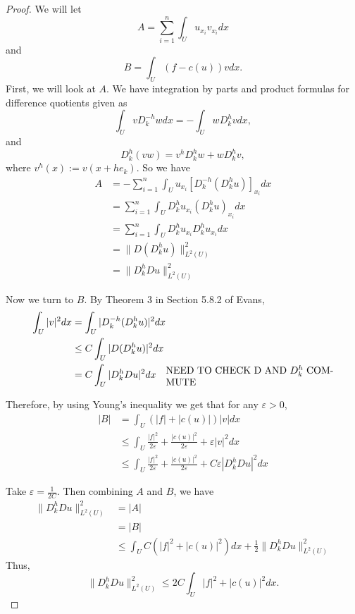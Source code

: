 \documentclass[a4paper]{article}
\begin{document}
\begin{enumerate}
\begin{proof}
      We will let
      \[ A = \sum_{i=1}^n \int_{U}^{} u_{x_i} v_{x_i} dx \]
      and
      \[ B = \int_{U}^{} (f - c(u)) v dx .\]
      First, we will look at $A$.
      We have integration by parts and product formulas for difference quotients given as
      \[ \int_{U}^{} v D_k^{-h} w dx = - \int_{U}^{} w D_k^h v dx ,\]
      and
      \[ D_k^h (vw) = v^h D_k^h w + w D_k^h v ,\]
      where $v^h(x) := v(x + he_k)$.
      So we have
      \begin{align*}
        A &= - \sum_{i=1}^n \int_{U}^{} u_{x_i} \left[ D_k^{-h} (D_k^h u) \right]_{x_i} dx \\
        &= \sum_{i=1}^n \int_{U}^{} D_k^h u_{x_i} \left( D_k^h u \right)_{x_i} dx \quad \\
        &= \sum_{i=1}^n \int_{U}^{} D_k^h u_{x_i} D_k^h u_{x_i} dx \\
        & = \| D (D_k^h u) \|_{L^2(U)}^2 \\
        &= \| D_k^h Du \|_{L^2(U)}^2
      \end{align*}

      Now we turn to $B$.
      By Theorem 3 in Section 5.8.2 of Evans,
      \begin{align*}
        \int_{U}^{} |v|^2 dx &= \int_{U}^{} |D_k^{-h} (D_k^h u)|^2 dx \\
        & \leq C \int_{U}^{} |D (D_k^h u)|^2 dx \\
        &= C \int_{U}^{} |D_k^h Du|^2 dx \quad \parbox{6cm}{NEED TO CHECK D AND $D_k^h$ COMMUTE}
      \end{align*}

      Therefore, by using Young's inequality we get that for any $\varepsilon > 0$,
      \begin{align*}
        |B| &= \int_{U}^{} (|f| + |c(u)|) |v| dx \\
        &\leq \int_{U}^{} \frac{|f|^2}{2 \varepsilon} + \frac{|c(u)|^2}{2 \varepsilon} + \varepsilon |v|^2 dx \\
        &\leq \int_{U}^{} \frac{|f|^2}{2 \varepsilon} + \frac{|c(u)|^2}{2 \varepsilon} + C\varepsilon |D_k^h Du|^2 dx
      \end{align*}

      Take $\varepsilon = \frac{1}{2C}$. Then combining $A$ and $B$, we have
      \begin{align*}
        \| D_k^h Du \|_{L^2(U)}^2 &= |A| \\
        &= |B| \\
        &\leq \int_{U}^{} C (|f|^2 + |c(u)|^2)dx + \frac{1}{2} \| D_k^h Du \|_{L^2(U)}^2
      \end{align*}
      Thus,
      \[ \| D_k^h Du \|_{L^2(U)}^2 \leq 2C \int_{U}^{} |f|^2 + |c(u)|^2 dx .\]


\end{proof}
\end{enumerate}
\end{document}
